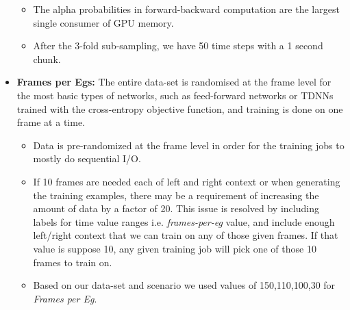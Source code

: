 \begin{itemize}
\begin{itemize}
        \item The alpha probabilities in forward-backward computation are the largest single consumer of GPU memory. 
        \item After the 3-fold sub-sampling, we have 50 time steps with a 1 second chunk.
    \end{itemize}
    \item \textbf{Frames per Egs:} The entire data-set is randomised at the frame level for the most basic types of networks, such as feed-forward networks or TDNNs trained with the cross-entropy objective function, and training is done on one frame at a time. 
    \begin{itemize}
        \item Data is pre-randomized at the frame level in order for the training jobs to mostly do sequential I/O. 
        \item If 10 frames are needed each of left and right context or when generating the training examples, there may be a requirement of increasing the amount of data by a factor of 20. This issue is resolved by including labels for time value ranges i.e. \textit{frames-per-eg} value, and include enough left/right context that we can train on any of those given frames. If that value is suppose 10, any given training job will pick one of those 10 frames to train on. 
        \item Based on our data-set and scenario we used values of 150,110,100,30 for \textit{Frames per Eg}.
    \end{itemize}
\end{itemize}



